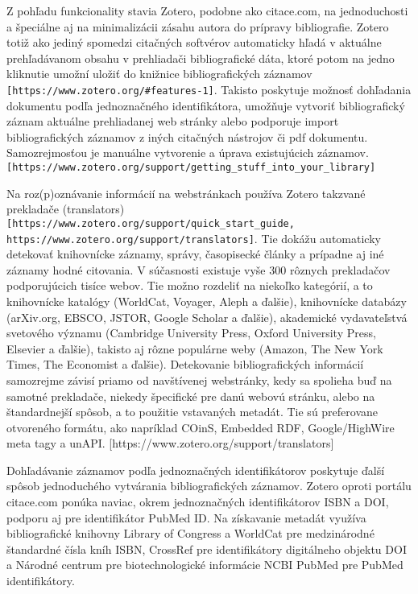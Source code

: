 \documentclass{fithesis3}
\begin{document}
	Z pohľadu funkcionality stavia Zotero, podobne ako citace.com, na jednoduchosti a špeciálne aj na minimalizácii zásahu autora do prípravy bibliografie. Zotero totiž ako jediný spomedzi citačných softvérov automaticky hľadá v aktuálne prehľadávanom obsahu v prehliadači bibliografické dáta, ktoré potom na jedno kliknutie umožní uložiť do knižnice bibliografických záznamov \verb+[https://www.zotero.org/#features-1]+. Takisto poskytuje možnosť dohľadania dokumentu podľa jednoznačného identifikátora, umožňuje vytvoriť bibliografický záznam aktuálne prehliadanej web stránky alebo podporuje import bibliografických záznamov z iných citačných nástrojov či pdf dokumentu. Samozrejmosťou je manuálne vytvorenie a úprava existujúcich záznamov. \verb+[https://www.zotero.org/support/getting_stuff_into_your_library]+
	
	Na roz(p)oznávanie informácií na webstránkach používa Zotero takzvané prekladače (translators) \verb+[https://www.zotero.org/support/quick_start_guide, https://www.zotero.org/support/translators]+. Tie dokážu automaticky detekovať knihovnícke záznamy, správy, časopisecké články a prípadne aj iné záznamy hodné citovania. V súčasnosti existuje vyše 300 rôznych prekladačov podporujúcich tisíce webov. Tie možno rozdeliť na niekoľko kategórií, a to knihovnícke katalógy (WorldCat, Voyager, Aleph a ďalšie), knihovnícke databázy (arXiv.org, EBSCO, JSTOR, Google Scholar a ďalšie), akademické vydavateľstvá svetového významu (Cambridge University Press, Oxford University Press, Elsevier a ďalšie), takisto aj rôzne populárne weby (Amazon, The New York Times, The Economist a ďalšie). Detekovanie bibliografických informácií samozrejme závisí priamo od navštívenej webstránky, kedy sa spolieha buď na samotné prekladače, niekedy špecifické pre danú webovú stránku, alebo na štandardnejší spôsob, a to použitie vstavaných metadát. Tie sú preferovane otvoreného formátu, ako napríklad COinS, Embedded RDF, Google/HighWire meta tagy a unAPI. [https://www.zotero.org/support/translators]
	
	Dohľadávanie záznamov podľa jednoznačných identifikátorov poskytuje ďalší spôsob jednoduchého vytvárania bibliografických záznamov. Zotero oproti portálu citace.com ponúka naviac, okrem jednoznačných identifikátorov ISBN a DOI, podporu aj pre identifikátor PubMed ID. Na získavanie metadát využíva bibliografické knihovny Library of Congress a WorldCat pre medzinárodné štandardné čísla kníh ISBN, CrossRef pre identifikátory digitálneho objektu DOI a Národné centrum pre biotechnologické informácie NCBI PubMed pre PubMed identifikátory.
	
\end{document}
